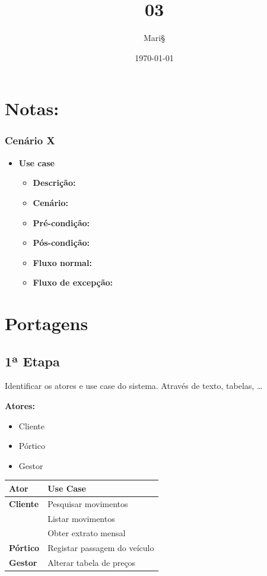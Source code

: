 \documentclass[11pt]{article}
\author{Mari§}
\date{\today}
\title{03}
\begin{document}
\maketitle
\tableofcontents

\section{Notas:}
\label{sec:org2298a99}
\subsubsection{Cenário X}
\label{sec:orgda0aec6}
\begin{itemize}
\item \textbf{Use case}
\begin{itemize}
\item \textbf{Descrição:}
\item \textbf{Cenário:}
\item \textbf{Pré-condição:}
\item \textbf{Pós-condição:}
\item \textbf{Fluxo normal:}
\item \textbf{Fluxo de excepção:}
\end{itemize}
\end{itemize}

\section{Portagens}
\label{sec:org1fac779}
\subsection{1ª Etapa}
\label{sec:org169ca8c}
Identificar os atores e use case do sistema.
Através de texto, tabelas, \ldots{}

\textbf{Atores:}
\begin{itemize}
\item Cliente
\item Pórtico
\item Gestor
\end{itemize}

\begin{center}
\begin{tabular}{ll}
\hline
\textbf{Ator} & \textbf{Use Case}\\
\hline
\textbf{Cliente} & Pesquisar movimentos\\
 & Listar movimentos\\
 & Obter extrato mensal\\
\hline
\textbf{Pórtico} & Registar passagem do veículo\\
\hline
\textbf{Gestor} & Alterar tabela de preços\\
\hline
\end{tabular}
\end{center}
\end{document}
